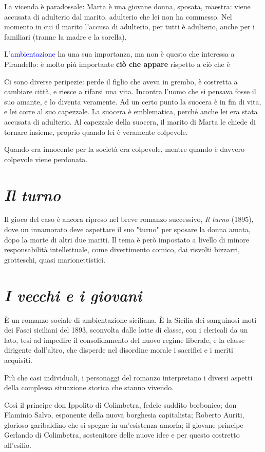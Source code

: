\documentclass[a4paper, twoside, titlepage]{book}
\newcounter{mar}
\renewcommand{\emph}[1]{\textcolor{blue}{#1}}
\begin{document}
La vicenda è paradossale: Marta è una giovane donna, sposata, maestra: viene accusata di adulterio dal marito, adulterio che lei non ha commesso. Nel momento in cui il marito l'accusa di adulterio, per tutti è adulterio, anche per i familiari (tranne la madre e la sorella).

L'\emph{ambientazione} ha una sua importanza, ma non è questo che interessa a Pirandello: è molto più importante \textbf{ciò che appare} rispetto a ciò che è

Ci sono diverse peripezie: perde il figlio che aveva in grembo, è costretta a cambiare città, e riesce a rifarsi una vita.
Incontra l'uomo che si pensava fosse il suo amante, e lo diventa veramente.
Ad un certo punto la suocera è in fin di vita, e lei corre al suo capezzale. La suocera è emblematica, perché anche lei era stata accusata di adulterio.
Al capezzale della suocera, il marito di Marta le chiede di tornare insieme, proprio quando lei è veramente colpevole.

Quando era innocente per la società era colpevole, mentre quando è davvero colpevole viene perdonata.

\section{\textit{Il turno}}

Il gioco del caso è ancora ripreso nel breve romanzo successivo, \textit{Il turno} (1895), dove un innamorato deve aspettare il suo "turno" per sposare la donna amata, dopo la morte di altri due mariti. Il tema è però impostato a livello di minore responsabilità intellettuale, come divertimento comico, dai risvolti bizzarri, grotteschi, quasi marionettistici.

\section{\textit{I vecchi e i giovani}}

È un romanzo sociale di ambientazione siciliana. È la Sicilia dei sanguinosi moti dei Fasci siciliani del 1893, sconvolta dalle lotte di classe, con i clericali da un lato, tesi ad impedire il consolidamento del nuovo regime liberale, e la classe dirigente dall'altro, che disperde nel disordine morale i sacrifici e i meriti acquisiti.

Più che casi individuali, i personaggi del romanzo interpretano i diversi aspetti della complessa situazione storica che stanno vivendo.

Così il principe don Ippolito di Colimbetra, fedele suddito borbonico; don Flaminio Salvo, esponente della nuova borghesia capitalista; Roberto Auriti, glorioso garibaldino che si spegne in un'esistenza amorfa; il giovane principe Gerlando di Colimbetra, sostenitore delle nuove idee e per questo costretto all'esilio.
\end{document}
